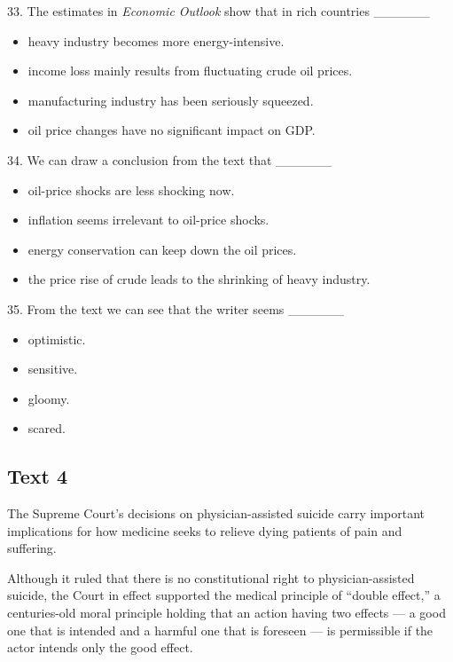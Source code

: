 \documentclass[UTF8,11pt]{ctexart}
\begin{document}
33. The estimates in \textit{Economic Outlook} show that in rich countries \_\_\_\_\_\_


\begin{itemize}[leftmargin=2em,itemsep=.2em,topsep=.4em]\item[A.] heavy industry becomes more energy-intensive.
\item[B.] income loss mainly results from fluctuating crude oil prices.
\item[C.] manufacturing industry has been seriously squeezed.
\item[D.] oil price changes have no significant impact on GDP.
\end{itemize}

34. We can draw a conclusion from the text that \_\_\_\_\_\_


\begin{itemize}[leftmargin=2em,itemsep=.2em,topsep=.4em]\item[A.] oil-price shocks are less shocking now.
\item[B.] inflation seems irrelevant to oil-price shocks.
\item[C.] energy conservation can keep down the oil prices.
\item[D.] the price rise of crude leads to the shrinking of heavy industry.
\end{itemize}

35. From the text we can see that the writer seems \_\_\_\_\_\_


\begin{itemize}[leftmargin=2em,itemsep=.2em,topsep=.4em]\item[A.] optimistic.
\item[B.] sensitive.
\item[C.] gloomy.
\item[D.] scared.
\end{itemize}

\subsection*{\textbf{Text 4}}


The Supreme Court’s decisions on physician-assisted suicide carry important implications for how medicine seeks to relieve dying patients of pain and suffering.


Although it ruled that there is no constitutional right to physician-assisted suicide, the Court in effect supported the medical principle of “double effect,” a centuries-old moral principle holding that an action having two effects — a good one that is intended and a harmful one that is foreseen — is permissible if the actor intends only the good effect.
\end{document}
